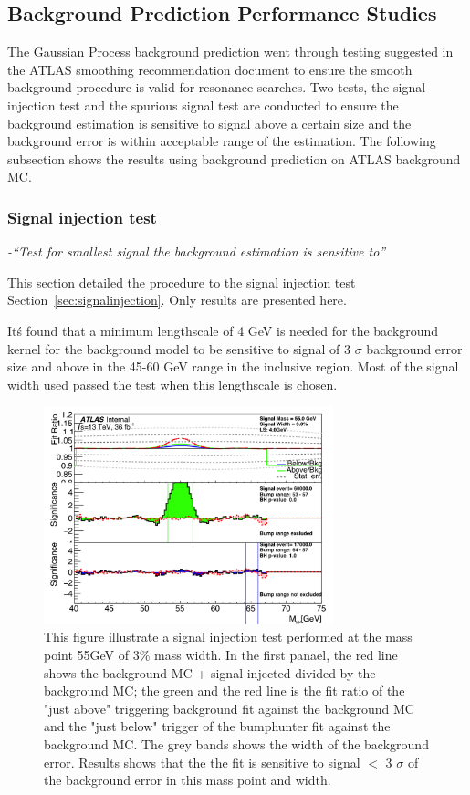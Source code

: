 \subsection{Background Prediction Performance Studies}
The Gaussian Process background prediction went through testing suggested in the ATLAS smoothing recommendation document to ensure the smooth background procedure is valid for resonance searches. Two tests, the signal injection test and the spurious signal test are conducted to ensure the background estimation is sensitive to signal above a certain size and the background error is within acceptable range of the estimation. The following subsection shows the results using background prediction on ATLAS background MC.  

\subsubsection{Signal injection test} 

\textit{-``Test for smallest signal the background estimation is sensitive to”}

This section detailed the procedure to the signal injection test Section~\ref{sec:signalinjection}. Only results are presented here.

It\'s found that a minimum lengthscale of 4 GeV is needed for the background kernel for the background model to be sensitive to signal of 3 $\sigma$ background error size and above in the 45-60 GeV range in the inclusive region. Most of the signal width used passed the test when this lengthscale is chosen. 

\begin{figure}[!htb]
    \begin{center}
        \includegraphics[width=0.75\textwidth]{figures/chapter_dimuon/signalInjection}        
        \caption{
        This figure illustrate a signal injection test performed at the mass point 55GeV of 3\% mass width. In the first panael, the red line shows the background MC + signal injected divided by the background MC; the green and the red line is the fit ratio of the "just above" triggering background fit against the background MC and the "just below" trigger of the bumphunter fit against the background MC. The grey bands shows the width of the background error. Results shows that the the fit is sensitive to signal $<$ 3 $\sigma$ of the background error in this mass point and width. }
    \label{fig:dimuonstudies}
    \end{center}
\end{figure}

